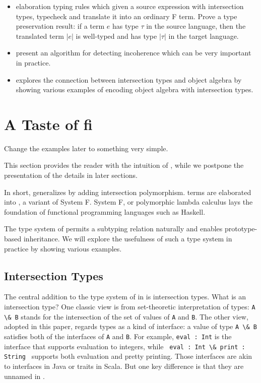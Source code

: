\documentclass[preprint]{sigplanconf}
\begin{document}
\begin{itemize}

\item{elaboration typing rules which given a source expression with intersection
    types, typecheck and translate it into an ordinary F term. Prove a type
    preservation result: if a term $e$ has type $\tau$ in the source language,
    then the translated term $|e|$ is well-typed and has type $|\tau|$ in the
    target language.}

\item{present an algorithm for detecting incoherence which can be very important
    in practice.}

\item{explores the connection between intersection types and object algebra by
    showing various examples of encoding object algebra with intersection
    types.}

\end{itemize}
\section{A Taste of fi}

\begin{footnote}
  Change the examples later to something very simple.
\end{footnote}

This section provides the reader with the intuition of \name, while we postpone
the presentation of the details in later sections.

In short, \name generalizes \systemf by adding intersection polymorphism. \name terms
are elaborated into \systemF, a variant of System F. System F, or polymorphic
lambda calculus lays the foundation of functional programming languages such as
Haskell.

The type system of \name permits a subtyping relation naturally and enables
prototype-based inheritance. We will explore the usefulness of such a type
system in practice by showing various examples.

\subsection{Intersection Types}

The central addition to the type system of \systemf in \name is intersection types. What
is an intersection type? One classic view is from set-theoretic interpretation
of types: \lstinline{A \& B} stands for the intersection of the set of values of
\lstinline{A} and \lstinline{B}. The other view, adopted in this paper, regards
types as a kind of interface: a value of type \lstinline{A \& B} satisfies both
of the interfaces of \lstinline{A} and \lstinline{B}. For example,
\lstinline{eval : Int} is the interface that supports evaluation to integers,
while \lstinline{ eval : Int \& print : String } supports both evaluation and
pretty printing. Those interfaces are akin to interfaces in Java or traits in
Scala. But one key difference is that they are unnamed in \name.
\end{document}
